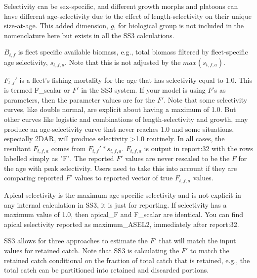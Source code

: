 Selectivity can be sex-specific, and different growth morphs and platoons can have different age-selectivity due to the effect of length-selectivity on their unique size-at-age. This added dimension, $g$, for biological group is not included in the nomenclature here but exists in all the SS3 calculations.

$B_{t,f}$ is fleet specific available biomass, e.g., total biomass filtered by fleet-specific age selectivity, $s_{t,f,a}$. Note that this is not adjusted by the $max(s_{t,f,a})$.

$F_{t,f}'$ is a fleet's fishing mortality for the age that has selectivity equal to 1.0. This is termed F\_scalar or  $F'$ in the SS3 system. If your model is using $F'$s as parameters, then the parameter values are for the $F'$. Note that some selectivity curves, like double normal, are explicit about having a maximum of 1.0. But other curves like logistic and combinations of length-selectivity and growth, may produce an age-selectivity curve that never reaches 1.0 and some situations, especially 2DAR, will produce selectivity >1.0 routinely. In all cases, the resultant $F_{t,f,a}$ comes from $F_{t,f}' * s_{t,f,a}$. $F_{t,f,a}$ is output in report:32 with the rows labelled simply as "F". The reported $F'$ values are never rescaled to be the $F$ for the age with peak selectivity. Users need to take this into account if they are comparing reported $F'$ values to reported vector of true $F_{t,f,a}$ values.

Apical selectivity is the maximum age-specific selectivity and is not explicit in any internal calculation in SS3, it is just for reporting. If selectivity has a maximum value of 1.0, then apical\_F and F\_scalar are identical. You can find apical selectivity reported as maximum\_ASEL2, immediately after report:32.

SS3 allows for three approaches to estimate the $F'$ that will match the input values for retained catch. Note that SS3 is calculating the $F'$ to match the retained catch conditional on the fraction of total catch that is retained, e.g., the total catch can be partitioned into retained and discarded portions.

